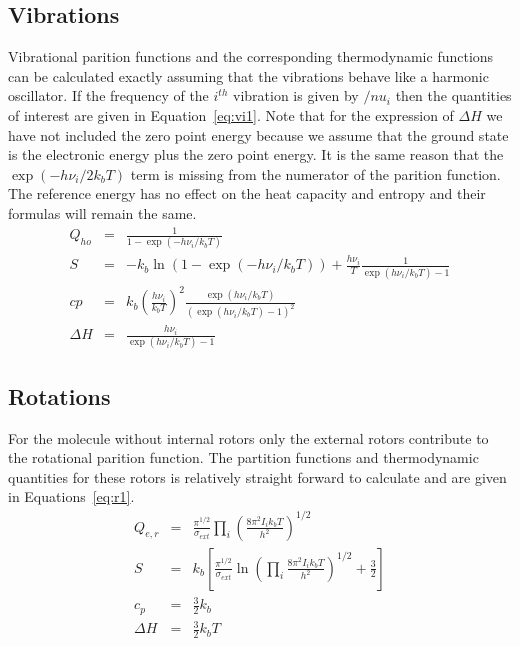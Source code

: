 \documentclass[a4paper,12pt]{article}
\begin{document}
\subsection{Vibrations}
Vibrational parition functions and the corresponding thermodynamic functions can be calculated exactly assuming that the vibrations behave like a harmonic oscillator. If the frequency of the $i^{th}$ vibration is given by $/nu_i$ then the quantities of interest are given in Equation~\ref{eq:vi1}. Note that for the expression of $\Delta H$ we have not included the zero point energy because we assume that the ground state is the electronic energy plus the zero point energy. It is the same reason that the $\exp{(-h\nu_i/2k_bT)}$ term is missing from the numerator of the parition function. The reference energy has no effect on the heat capacity and entropy and their formulas will remain the same.
\begin{eqnarray}
Q_{ho} &=& \frac{1}{1-\exp{(-h\nu_i/k_bT)}} \nonumber \\
S &=& -k_b \ln\left(1-\exp{(-h\nu_i/k_bT)}\right)+\frac{h\nu_i}{T}\frac{1}{\exp{(h\nu_i/k_bT)}-1}\nonumber \\
cp &=& k_b\left(\frac{h\nu_i}{k_bT}\right)^2 \frac{\exp{(h\nu_i/k_bT)}}{\left(\exp{(h\nu_i/k_bT)}-1\right)^2}\nonumber \\
\Delta H &=& \frac{h\nu_i}{\exp{(h\nu_i/k_bT)}-1}
\label{eq:vi1}
\end{eqnarray}

\subsection{Rotations}
For the molecule without internal rotors only the external rotors contribute to the rotational parition function. The partition functions and thermodynamic quantities for these rotors is relatively straight forward to calculate and are given in Equations~\ref{eq:r1}.
\begin{eqnarray}
 Q_{e,r}&=&\frac{\pi^{1/2}}{\sigma_{ext}}\prod_i \left(\frac{8\pi^2I_ik_bT}{ h^2}\right)^{1/2} \nonumber \\
S&=& k_b \left[\frac{\pi^{1/2}}{\sigma_{ext}} \ln \left(\prod_i \frac{8\pi^2I_ik_bT}{h^2}\right)^{1/2} +\frac{3}{2}\right] \nonumber \\
c_p&=& \frac{3}{2}k_b\nonumber \\
\Delta H &=& \frac{3}{2}k_bT
\label{eq:r1}
\end{eqnarray}
\end{document}
